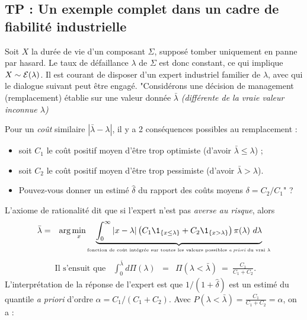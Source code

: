 \subsection{TP : Un exemple complet dans un cadre de fiabilité industrielle }

Soit $X$ la durée de vie d'un composant $\Sigma$, supposé tomber uniquement en panne par hasard. Le taux de défaillance $\lambda$ de $\Sigma$ est donc constant, ce qui implique  $X\sim {\cal{E}}(\lambda)$. Il est courant de disposer d'un  expert industriel  familier de $\lambda$, avec qui le dialogue suivant peut être engagé. 
 "Considérons une décision de management (remplacement) établie sur une valeur donnée $\bar{\lambda}$ \emph{(différente de la vraie valeur inconnue $\lambda$)}
\item Pour un \emph{co\^ut} similaire  $|\bar{\lambda}-\lambda|$, il y a 2 conséquences possibles au remplacement : 
\begin{itemize}
\item  soit $C_1$ le co\^ut positif moyen d'\^etre trop optimiste (d'avoir $\bar{\lambda}\leq \lambda$) ; 
\item  soit $C_2$ le co\^ut positif moyen d'\^etre trop pessimiste (d'avoir $\bar{\lambda}>\lambda$). 
\item Pouvez-vous donner un estimé $\hat{\delta}$ du rapport des co\^uts moyens $\delta=C_2/C_1$" ?
\end{itemize}
L'axiome de rationalité dit que si l'expert n'est pas \emph{averse au risque}, alors 
\begin{eqnarray*}
\bar{\lambda} & = & \arg\min_{x} \underbrace{\int_{0}^{\infty} \left|x-\lambda\right|\left(C_1\1_{\{x\leq \lambda\}} + C_2\1_{\{x>\lambda\}}\right) \pi(\lambda) \ d\lambda}_{\text{\tiny fonction de co\^ut intégr\'ee sur toutes les valeurs possibles {\it a priori} du vrai $\lambda$}} 
\end{eqnarray*}
\begin{eqnarray*}
\text{ Il s'ensuit que} \ \ \ \ \int_{0}^{\bar{\lambda}} d\Pi(\lambda) & = & \Pi(\lambda<\bar{\lambda}) \ = \ \frac{C_1}{C_1+C_2}.  
\end{eqnarray*} 
 L'interprétation de la réponse de l'expert est que $1/(1+\hat{\delta})$ est un estimé du quantile {\it a priori} d'ordre $\alpha=C_1/(C_1+C_2)$. 
Avec $P(\lambda<\bar{\lambda})=\frac{C_1}{C_1+C_2}=\alpha$, on a :

